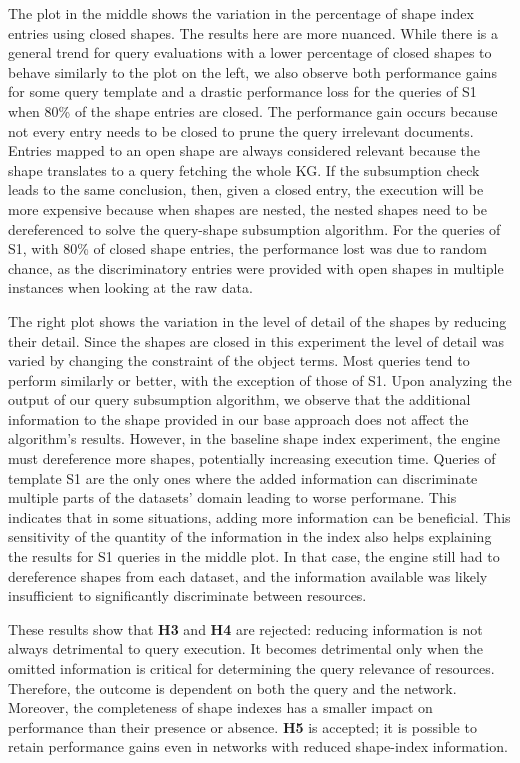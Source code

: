 The plot in the middle shows the variation in the percentage of shape index entries using closed shapes.
The results here are more nuanced.
While there is a general trend for query evaluations with a lower percentage of closed shapes to behave similarly to the plot on the left, we also observe both performance gains for some query template and a drastic performance loss for the queries of S1 when 80\% of the shape entries are closed.
The performance gain occurs because not every entry needs to be closed to prune the query irrelevant documents.
Entries mapped to an open shape are always considered relevant because the shape translates to a query fetching the whole KG.
If the subsumption check leads to the same conclusion, then, given a closed entry, the execution will be more expensive because 
when shapes are nested, the nested shapes need to be dereferenced to solve the query-shape subsumption algorithm.
For the queries of S1, with 80\% of closed shape entries, the performance lost was due to random chance, as the discriminatory entries were provided with open shapes in multiple instances when looking at the raw data.

The right plot shows the variation in the level of detail of the shapes by reducing their detail.
Since the shapes are closed in this experiment the level of detail was varied by changing the constraint of the object terms.
Most queries tend to perform similarly or better, with the exception of those of S1.
Upon analyzing the output of our query subsumption algorithm, we observe that the additional information to the shape provided in our base approach does not affect the algorithm's results.
However, in the baseline shape index experiment, the engine must dereference more shapes, potentially increasing execution time.
Queries of template S1 are the only ones where the added information can discriminate multiple parts of the datasets' domain leading to worse performane.
This indicates that in some situations, adding more information can be beneficial.
This sensitivity of the quantity of the information in the index also helps explaining the results for S1 queries in the middle plot. 
In that case, the engine still had to dereference shapes from each dataset, and the information available was likely insufficient to significantly discriminate between resources.

These results show that \textbf{H3} and \textbf{H4} are rejected: reducing information is not always detrimental to query execution.
It becomes detrimental only when the omitted information is critical for determining the query relevance of resources. 
Therefore, the outcome is dependent on both the query and the network. 
Moreover, the completeness of shape indexes has a smaller impact on performance than their presence or absence.
\textbf{H5} is accepted; it is possible to retain performance gains even in networks with reduced shape-index information.

